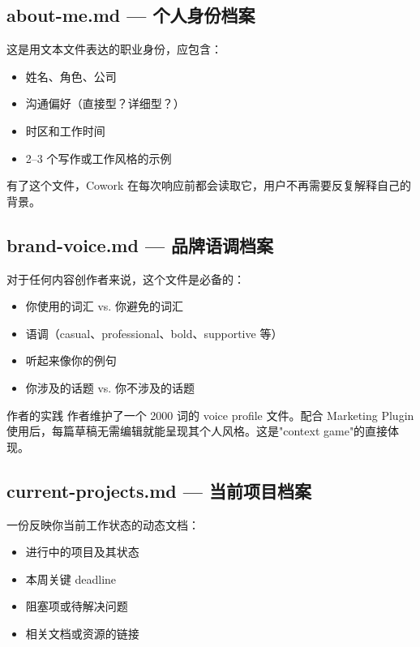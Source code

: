\documentclass[a4paper]{article}
\begin{document}
\subsection{about-me.md --- 个人身份档案}

这是用文本文件表达的职业身份，应包含：

\begin{itemize}
    \item 姓名、角色、公司
    \item 沟通偏好（直接型？详细型？）
    \item 时区和工作时间
    \item 2--3 个写作或工作风格的示例
\end{itemize}

有了这个文件，Cowork 在每次响应前都会读取它，用户不再需要反复解释自己的背景。

\subsection{brand-voice.md --- 品牌语调档案}
\label{sec:brand-voice}

对于任何内容创作者来说，这个文件是必备的：

\begin{itemize}
    \item 你使用的词汇 vs. 你避免的词汇
    \item 语调（casual、professional、bold、supportive 等）
    \item 听起来像你的例句
    \item 你涉及的话题 vs. 你不涉及的话题
\end{itemize}

\begin{knowledgebox}{作者的实践}
作者维护了一个 2000 词的 voice profile 文件。配合 Marketing Plugin 使用后，每篇草稿无需编辑就能呈现其个人风格。这是"context game"的直接体现。
\end{knowledgebox}

\subsection{current-projects.md --- 当前项目档案}

一份反映你当前工作状态的动态文档：

\begin{itemize}
    \item 进行中的项目及其状态
    \item 本周关键 deadline
    \item 阻塞项或待解决问题
    \item 相关文档或资源的链接
\end{itemize}
\end{document}
